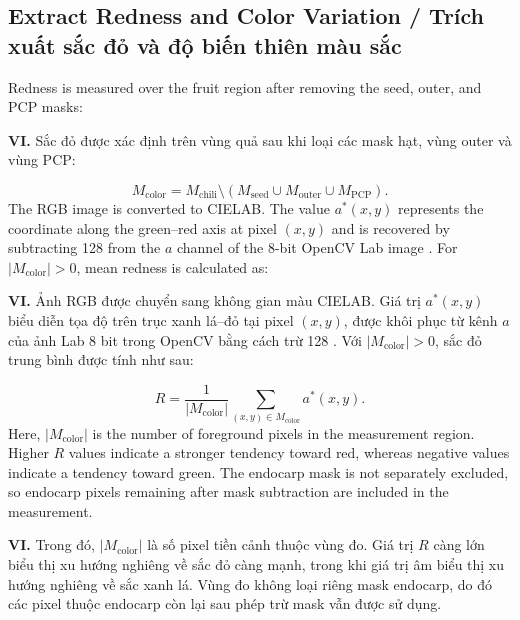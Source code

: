 \documentclass[final,1p,11pt,longtitle]{elsarticle}
\newenvironment{viet}{\par\smallskip\begingroup\color{viColor}\noindent\textbf{VI. }\ignorespaces}{\par\endgroup\smallskip}
\begin{document}
\subsection*{Extract Redness and Color Variation / {\color{viColor} Trích xuất sắc đỏ và độ biến thiên màu sắc}}
Redness is measured over the fruit region after removing the seed, outer, and PCP masks:

\begin{viet}
Sắc đỏ được xác định trên vùng quả sau khi loại các mask hạt, vùng outer và vùng PCP:
\end{viet}

\begin{equation}
M_{\mathrm{color}}=M_{\mathrm{chili}}\setminus\left(M_{\mathrm{seed}}\cup M_{\mathrm{outer}}\cup M_{\mathrm{PCP}}\right).
\end{equation}
The RGB image is converted to CIELAB. The value $a^*(x,y)$ represents the coordinate along the green--red axis at pixel $(x,y)$ and is recovered by subtracting 128 from the $a$ channel of the 8-bit OpenCV Lab image \cite{cielab}. For $|M_{\mathrm{color}}|>0$, mean redness is calculated as:

\begin{viet}
Ảnh RGB được chuyển sang không gian màu CIELAB. Giá trị $a^*(x,y)$ biểu diễn tọa độ trên trục xanh lá--đỏ tại pixel $(x,y)$, được khôi phục từ kênh $a$ của ảnh Lab 8 bit trong OpenCV bằng cách trừ 128 \cite{cielab}. Với $|M_{\mathrm{color}}|>0$, sắc đỏ trung bình được tính như sau:
\end{viet}

\begin{equation}
R=\frac{1}{|M_{\mathrm{color}}|}\sum_{(x,y)\in M_{\mathrm{color}}}a^*(x,y).
\end{equation}
Here, $|M_{\mathrm{color}}|$ is the number of foreground pixels in the measurement region. Higher $R$ values indicate a stronger tendency toward red, whereas negative values indicate a tendency toward green. The endocarp mask is not separately excluded, so endocarp pixels remaining after mask subtraction are included in the measurement.

\begin{viet}
Trong đó, $|M_{\mathrm{color}}|$ là số pixel tiền cảnh thuộc vùng đo. Giá trị $R$ càng lớn biểu thị xu hướng nghiêng về sắc đỏ càng mạnh, trong khi giá trị âm biểu thị xu hướng nghiêng về sắc xanh lá. Vùng đo không loại riêng mask endocarp, do đó các pixel thuộc endocarp còn lại sau phép trừ mask vẫn được sử dụng.
\end{viet}
\end{document}
